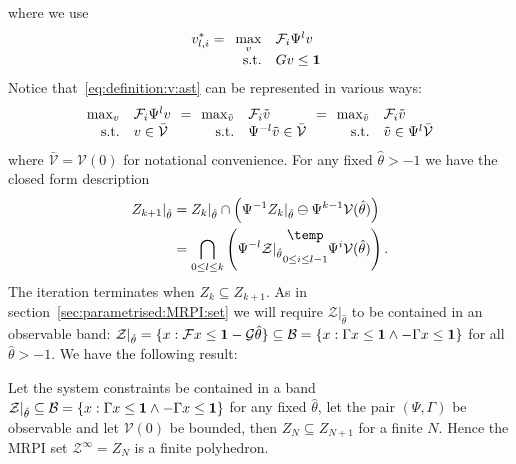 %
where we use 
%
\begin{equation}\label{eq:definition:v:ast}
v_{l,i}^\ast = \begin{array}[t]{rl}\displaystyle\max_v & \mathcal F_i \Psi^{l} v \\ \text{s.t.}& Gv\leq{\bf{1}}
\end{array}
\end{equation}
%
Notice that~\eqref{eq:definition:v:ast} can be represented in various ways:
%
\[
\begin{array}{@{}rl@{\hspace{0.7em}}c@{\hspace{0.7em}}rl@{\hspace{0.7em}}c@{\hspace{0.7em}}rl@{}}
\max_v&\mathcal F_i \Psi^l v &=& \max_{\tilde v}&\mathcal F_i \tilde  v &=& \max_{\tilde v}&\mathcal F_i \tilde v \\ 
\text{s.t.}&v\in\bar{\mathcal{V}} & & \text{s.t.}&\Psi^{-l} \tilde v\in\bar{\mathcal{V}} & &
\text{s.t.}& \tilde v\in\Psi^l\bar{\mathcal{V}}
\end{array}
\]
%
where $\bar{\mathcal{V}}=\mathcal V(0)$ for notational convenience. 
%
For any fixed $\hat\theta>-1$ we have the closed form description
%
\begin{equation}\label{eq:closed:form:parametrised:iterates}
\begin{split}
	Z_{k+1}\vert_{\hat\theta} &= Z_{k}\vert_{\hat\theta}\cap\left(
	\Psi^{-1}Z_k\vert_{\hat\theta}\ominus\Psi^{k-1}\mathcal V(\hat\theta)\right)\\
	&=\bigcap_{0\leq l\leq k}\left(\Psi^{-l}\mathcal Z\vert_{\hat\theta}\underset{0\leq i\leq l-1}{\bigominus} 
	\Psi^i \mathcal V(\hat\theta)
	\right).
\end{split}
\end{equation}
%
The iteration terminates when $Z_k\subseteq Z_{k+1}$. 
%
As in section~\ref{sec:parametrised:MRPI:set} we will require $\mathcal Z\vert_{\hat\theta}$ to be contained 
in an observable band: $\mathcal Z\vert_{\hat\theta}=\{x:\mathcal Fx \leq {\bf{1}}-\mathcal 
G\hat\theta\}\subseteq \mathcal B=\{x:\Gamma x\leq {\bf{1}}\wedge -\Gamma 
x\leq {\bf{1}}\}$ for all $\hat\theta>-1$. 
%
We have the following result:
%
\begin{thm}
Let the system constraints be contained in a band $\mathcal Z\vert_{\hat\theta}\subseteq\mathcal 
B=\{x:\Gamma x\leq {\bf{1}}\wedge -\Gamma x\leq {\bf{1}}\}$ for any fixed $\hat\theta$, let the
pair $(\Psi,\Gamma)$ be observable and let $\mathcal V(0)$ be bounded, then $Z_N\subseteq Z_{N+1}$
for a finite $N$. Hence the MRPI set $\mathcal Z^\infty = Z_N$ is a finite polyhedron.
\end{thm}
